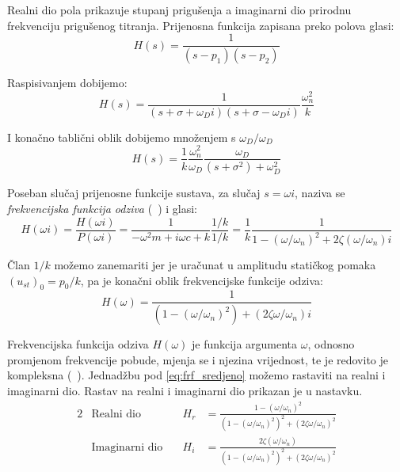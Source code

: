 Realni dio pola prikazuje stupanj prigušenja  a
imaginarni dio prirodnu frekvenciju prigušenog titranja. Prijenosna funkcija
zapisana preko polova glasi:
\begin{equation}
    H(s)=\frac{1}{(s-p_1)(s-p_2)}
\end{equation}

Raspisivanjem dobijemo:
\begin{equation}
    H(s)=\frac{1}{(s+\sigma+\omega_Di)(s+\sigma-\omega_Di)}\frac{\omega_n^2}{k}
\end{equation}

I konačno tablični oblik dobijemo množenjem s $\omega_D/\omega_D$
\begin{equation}
    H(s)=\frac{1}{k}\frac{\omega_n^2}{\omega_D}\frac{\omega_D}{(s+\sigma^2)+\omega_D^2}
\end{equation}

Poseban slučaj prijenosne funkcije sustava, za slučaj $s=\omega i$, naziva se
\textit{frekvencijska funkcija odziva} (~\cite{sisbabic}) i glasi:
\begin{equation} \label{eq:frf_nesredjeno}
    H(\omega i) = \frac{H(\omega i)}{P(\omega i)}
                = \frac{1}{-\omega^2 m + i\omega c + k}\frac{1/k}{1/k}
                = \frac{1}{k}\frac{1}{1-(\omega/\omega_n)^2+2\zeta(\omega/\omega_n)i}
\end{equation}

Član $1/k$ možemo zanemariti jer je uračunat u amplitudu statičkog pomaka $(u_{st})_0=p_0/k$,
pa je konačni oblik frekvencijske funkcije odziva:
\begin{equation}\label{eq:frf_sredjeno}
    H(\omega) = \frac{1}{\left(1-(\omega/\omega_n)^2\right)+\left(2\zeta\omega/\omega_n\right)i}
\end{equation}

Frekvencijska funkcija odziva $H(\omega)$ je funkcija argumenta $\omega$, odnosno promjenom
frekvencije pobude, mjenja se i njezina vrijednost, te je redovito je kompleksna (~\cite{sisbabic}).
Jednadžbu pod \eqref{eq:frf_sredjeno} možemo rastaviti na realni i imaginarni dio.
Rastav na realni i imaginarni dio prikazan je u nastavku.
\begin{alignat}{2}
    &\text{Realni dio} & H_r &= \frac{1-(\omega/\omega_n)^2}{(1-(\omega/\omega_n)^2)^2+(2\zeta\omega/\omega_n)^2}
        \label{eq:realni_dio_frf}\\
    &\text{Imaginarni dio}\quad & H_i &=\frac{2\zeta(\omega/\omega_n)}{(1-(\omega/\omega_n)^2)^2+(2\zeta\omega/\omega_n)^2}
        \label{eq:imaginarni_dio_frf}
\end{alignat}

